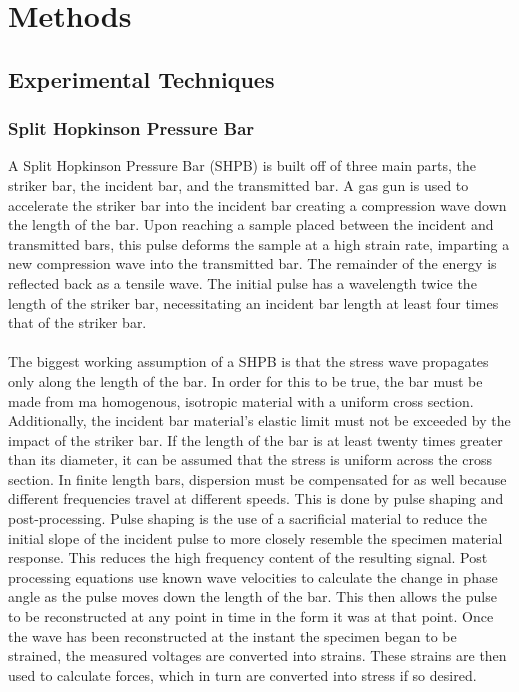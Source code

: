 \documentclass[12pt]{article}
\begin{document}
\section{Methods}

\subsection{Experimental Techniques} 

\subsubsection {Split Hopkinson Pressure Bar} %

A Split Hopkinson Pressure Bar (SHPB) is built off of three main parts, the striker bar, the incident bar, and the transmitted bar. A gas gun is used to accelerate the striker bar into the incident bar creating a compression wave down the length of the bar. Upon reaching a sample placed between the incident and transmitted bars, this pulse deforms the sample at a high strain rate, imparting a new compression wave into the transmitted bar. The remainder of the energy is reflected back as a tensile wave. The initial pulse has a wavelength twice the length of the striker bar, necessitating an incident bar length at least four times that of the striker bar.
\\ \\
The biggest working assumption of a SHPB is that the stress wave propagates only along the length of the bar. In order for this to be true, the bar must be made from ma homogenous, isotropic material with a uniform cross section. Additionally, the incident bar material's elastic limit must not be exceeded by the impact of the striker bar. If the length of the bar is at least twenty times greater than its diameter, it can be assumed that the stress is uniform across the cross section. In finite length bars, dispersion must be compensated for as well because different frequencies travel at different speeds. This is done by pulse shaping and post-processing. Pulse shaping is the use of a sacrificial material to reduce the initial slope of the incident pulse to more closely resemble the specimen material response. This reduces the high frequency content of the resulting signal. Post processing equations use known wave velocities to calculate the change in phase angle as the pulse moves down the length of the bar. This then allows the pulse to be reconstructed at any point in time in the form it was at that point. Once the wave has been reconstructed at the instant the specimen began to be strained, the measured voltages are converted into strains. These strains are then used to calculate forces, which in turn are converted into stress if so desired. 
\end{document}

